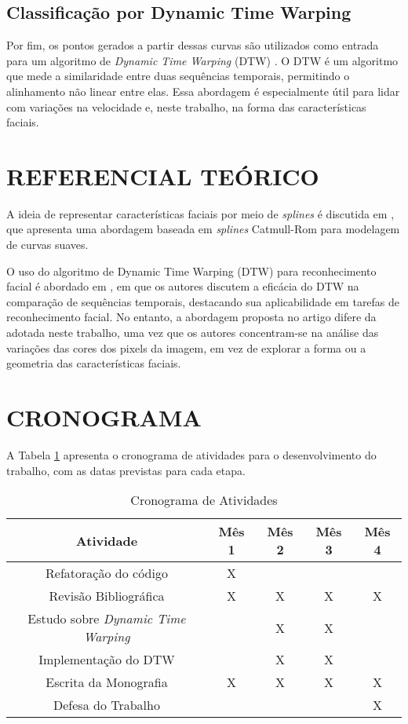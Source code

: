 \subsection{Classificação por Dynamic Time Warping}

Por fim, os pontos gerados a partir dessas curvas são utilizados como entrada para um algoritmo de \textit{Dynamic Time Warping} (DTW) \cite{SAKOE, tavenard.blog.dtw}. O DTW é um algoritmo que mede a similaridade entre duas sequências temporais, permitindo o alinhamento não linear entre elas. Essa abordagem é especialmente útil para lidar com variações na velocidade e, neste trabalho, na forma das características faciais.

\section{REFERENCIAL TEÓRICO}

A ideia de representar características faciais por meio de \textit{splines} é discutida em \cite{RepresentationSplines}, que apresenta uma abordagem baseada em \textit{splines} Catmull-Rom para modelagem de curvas suaves. 

O uso do algoritmo de Dynamic Time Warping (DTW) para reconhecimento facial é abordado em \cite{DTW_LSTM}, em que os autores discutem a eficácia do DTW na comparação de sequências temporais, destacando sua aplicabilidade em tarefas de reconhecimento facial. No entanto, a abordagem proposta no artigo difere da adotada neste trabalho, uma vez que os autores concentram-se na análise das variações das cores dos pixels da imagem, em vez de explorar a forma ou a geometria das características faciais.

\section{CRONOGRAMA}

A Tabela \ref{tab:crono} apresenta o cronograma de atividades para o desenvolvimento do trabalho, com as datas previstas para cada etapa.

\begin{table}[ht] 
    \centering
    \caption{Cronograma de Atividades}
    \label{tab:crono}
    \begin{tabular}{|c|c|c|c|c|}
    \hline
    \textbf{Atividade} & \textbf{Mês 1} & \textbf{Mês 2} & \textbf{Mês 3} & \textbf{Mês 4} \\ \hline
    Refatoração do código & X &  &  & \\ \hline
    Revisão Bibliográfica &  X & X & X & X \\ \hline
    Estudo sobre \textit{Dynamic Time Warping} &  & X & X & \\ \hline
    Implementação do DTW &  & X & X & \\ \hline
    Escrita da Monografia & X & X & X & X \\ \hline
    Defesa do Trabalho &  &  &  &  X\\ \hline
    \end{tabular}
\end{table}
